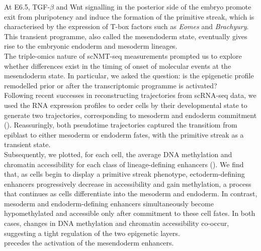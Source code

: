 At E6.5, TGF-$\beta$ and Wnt signalling in the posterior side of the embryo promote exit from pluripotency and induce the formation of the primitive streak, which is characterised by the expression of T-box factors such as \textit{Eomes} and \textit{Brachyury}\cite{Tosci2019}. This transient programme, also called the mesendoderm state, eventually gives rise to the embryonic endoderm and mesoderm lineages. \\
The triple-omics nature of scNMT-seq measurements prompted us to explore whether differences exist in the timing of onset of molecular events at the mesendoderm state. In particular, we asked the question: is the epigenetic profile remodelled prior or after the transcriptomic programme is activated? \\
Following recent successes in reconstructing trajectories from scRNA-seq data, we used the RNA expression profiles to order cells by their developmental state to generate two trajectories, corresponding to mesoderm and endoderm commitment (). Reassuringly, both pseudotime trajectories captured the transitiom from epiblast to either mesoderm or endoderm fates, with the primitive streak as a transient state.\\
 Subsequently, we plotted, for each cell, the average DNA methylation and chromatin accessibility for each class of lineage-defining enhancers (). 
We find that, as cells begin to display a primitive streak phenotype, ectoderm-defining enhancers progressively decrease in accessibility and gain methylation, a process that continues as cells differentiate into the mesoderm and endoderm. In contrast, mesoderm and endoderm-defining enhancers simultaneously become hypomethylated and accessible only after commitment to these cell fates. In both cases, changes in DNA methylation and chromatin accessibility co-occur, suggesting a tight regulation of the two epigenetic layers.\\

precedes the activation of the mesendoderm enhancers. 



